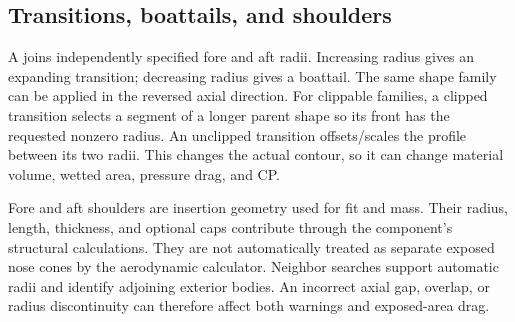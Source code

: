 
\subsection{Transitions, boattails, and shoulders}
A  joins independently specified fore and aft radii. Increasing radius gives an expanding transition; decreasing radius gives a boattail. The same shape family can be applied in the reversed axial direction. For clippable families, a clipped transition selects a segment of a longer parent shape so its front has the requested nonzero radius. An unclipped transition offsets/scales the profile between its two radii. This changes the actual contour, so it can change material volume, wetted area, pressure drag, and CP.

Fore and aft shoulders are insertion geometry used for fit and mass. Their radius, length, thickness, and optional caps contribute through the component's structural calculations. They are not automatically treated as separate exposed nose cones by the aerodynamic calculator. Neighbor searches support automatic radii and identify adjoining exterior bodies. An incorrect axial gap, overlap, or radius discontinuity can therefore affect both warnings and exposed-area drag.


